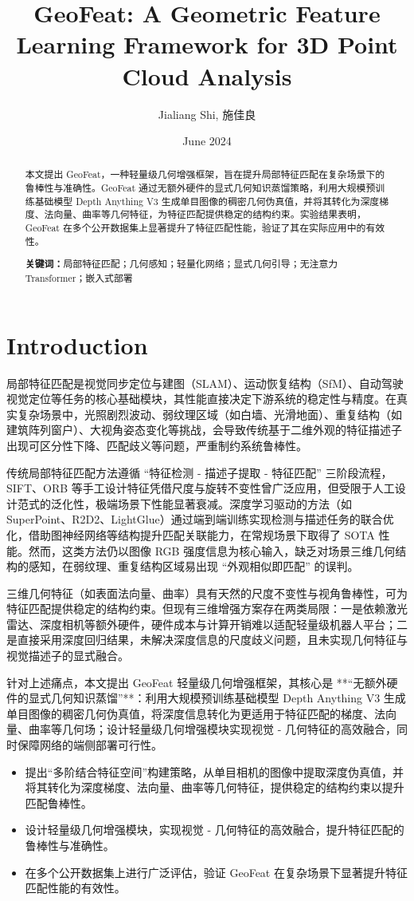 \documentclass{article}
\title{GeoFeat: A Geometric Feature Learning Framework for 3D Point Cloud Analysis}
\author{Jialiang Shi, 施佳良}
\date{June 2024}
\begin{document}
	\maketitle
	\begin{abstract}
		\par 本文提出 GeoFeat，一种轻量级几何增强框架，旨在提升局部特征匹配在复杂场景下的鲁棒性与准确性。GeoFeat 通过无额外硬件的显式几何知识蒸馏策略，利用大规模预训练基础模型 Depth Anything V3\cite{Orb-slam2} 生成单目图像的稠密几何伪真值，并将其转化为深度梯度、法向量、曲率等几何特征，为特征匹配提供稳定的结构约束。实验结果表明，GeoFeat 在多个公开数据集上显著提升了特征匹配性能，验证了其在实际应用中的有效性。
		\par\noindent\textbf{关键词：}局部特征匹配；几何感知；轻量化网络；显式几何引导；无注意力 Transformer；嵌入式部署
	\end{abstract}
	\section{Introduction}
		\par 局部特征匹配是视觉同步定位与建图（SLAM）、运动恢复结构（SfM）、自动驾驶视觉定位等任务的核心基础模块，其性能直接决定下游系统的稳定性与精度。在真实复杂场景中，光照剧烈波动、弱纹理区域（如白墙、光滑地面）、重复结构（如建筑阵列窗户）、大视角姿态变化等挑战，会导致传统基于二维外观的特征描述子出现可区分性下降、匹配歧义等问题，严重制约系统鲁棒性。
		\par 传统局部特征匹配方法遵循 “特征检测 - 描述子提取 - 特征匹配” 三阶段流程，SIFT、ORB 等手工设计特征凭借尺度与旋转不变性曾广泛应用，但受限于人工设计范式的泛化性，极端场景下性能显著衰减。深度学习驱动的方法（如 SuperPoint、R2D2、LightGlue）通过端到端训练实现检测与描述任务的联合优化，借助图神经网络等结构提升匹配关联能力，在常规场景下取得了 SOTA 性能。然而，这类方法仍以图像 RGB 强度信息为核心输入，缺乏对场景三维几何结构的感知，在弱纹理、重复结构区域易出现 “外观相似即匹配” 的误判。
		\par 三维几何特征（如表面法向量、曲率）具有天然的尺度不变性与视角鲁棒性，可为特征匹配提供稳定的结构约束。但现有三维增强方案存在两类局限：一是依赖激光雷达、深度相机等额外硬件，硬件成本与计算开销难以适配轻量级机器人平台；二是直接采用深度回归结果，未解决深度信息的尺度歧义问题，且未实现几何特征与视觉描述子的显式融合。
		\par 针对上述痛点，本文提出 GeoFeat 轻量级几何增强框架，其核心是 **“无额外硬件的显式几何知识蒸馏”**：利用大规模预训练基础模型 Depth Anything V3 生成单目图像的稠密几何伪真值，将深度信息转化为更适用于特征匹配的梯度、法向量、曲率等几何场；设计轻量级几何增强模块实现视觉 - 几何特征的高效融合，同时保障网络的端侧部署可行性。
		\begin{itemize}
		\item 提出“多阶结合特征空间”构建策略，从单目相机的图像中提取深度伪真值，并将其转化为深度梯度、法向量、曲率等几何特征，提供稳定的结构约束以提升匹配鲁棒性。
		\item 设计轻量级几何增强模块，实现视觉 - 几何特征的高效融合，提升特征匹配的鲁棒性与准确性。
		\item 在多个公开数据集上进行广泛评估，验证 GeoFeat 在复杂场景下显著提升特征匹配性能的有效性。
		\end{itemize}
\end{document}

